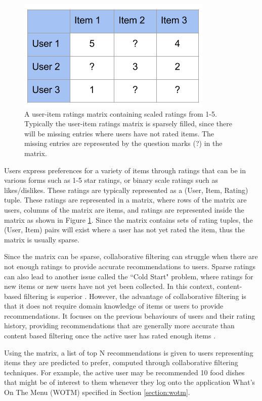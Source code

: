 \begin{figure}
\centering
\includegraphics[scale=0.7]{images/User-Item}
\caption{A user-item ratings matrix containing scaled ratings from 1-5. Typically the user-item ratings matrix is sparsely filled, since there will be missing entries where users have not rated items. The missing entries are represented by the question marks (?) in the matrix. }
\label{fig:matrix}
\end{figure}

Users express preferences for a variety of items through ratings that can be in various forms such as 1-5 star ratings, or binary scale ratings such as likes/dislikes. These ratings are typically represented as a (User, Item, Rating) tuple. These ratings are represented in a matrix, where rows of the matrix are users, columns of the matrix are items, and ratings are represented inside the matrix as shown in Figure \ref{fig:matrix}. Since the matrix contains sets of rating tuples, the (User, Item) pairs will exist where a user has not yet rated the item, thus the matrix is usually sparse.

Since the matrix can be sparse, collaborative filtering can struggle when there are not enough ratings to provide accurate recommendations to users. Sparse ratings can also lead to another issue called the ``Cold Start" problem, where ratings for new items or new users have not yet been collected. In this context, content-based filtering is superior \cite{koren2009matrix}. However, the advantage of collaborative filtering is that it does not require domain knowledge of items or users to provide recommendations. It focuses on the previous behaviours of users and their rating history, providing recommendations that are generally more accurate than content based filtering once the active user has rated enough items \cite{koren2009matrix, schafer2007collaborative}. 

Using the matrix, a list of top N recommendations is given to users representing items they are predicted to prefer, computed through collaborative filtering techniques. For example, the active user may be recommended 10 food dishes that might be of interest to them whenever they log onto the application What's On The Menu (WOTM) specified in Section \ref{section:wotm}.  

